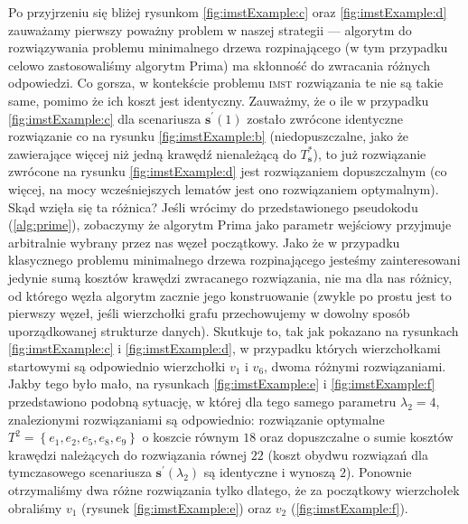 Po przyjrzeniu się bliżej rysunkom \ref{fig:imstExample:c} oraz \ref{fig:imstExample:d} zauważamy pierwszy poważny problem w naszej strategii --- algorytm do rozwiązywania problemu minimalnego drzewa rozpinającego (w tym przypadku celowo zastosowaliśmy algorytm Prima) ma skłonność do zwracania różnych odpowiedzi. Co gorsza, w kontekście problemu \textsc{imst} rozwiązania te nie są takie same, pomimo że ich koszt jest identyczny. Zauważmy, że o ile w przypadku \ref{fig:imstExample:c} dla scenariusza $\textbf{s}^{\prime} \left( 1 \right)$ zostało zwrócone identyczne rozwiązanie co na rysunku \ref{fig:imstExample:b} (niedopuszczalne, jako że zawierające więcej niż jedną krawędź nienależącą do $T^{\ast}_{\textbf{s}}$), to już rozwiązanie zwrócone na rysunku \ref{fig:imstExample:d} jest rozwiązaniem dopuszczalnym (co więcej, na mocy wcześniejszych lematów jest ono rozwiązaniem optymalnym). Skąd wzięła się ta różnica? Jeśli wrócimy do przedstawionego pseudokodu (\ref{alg:prime}), zobaczymy że algorytm Prima jako parametr wejściowy przyjmuje arbitralnie wybrany przez nas węzeł początkowy. Jako że w przypadku klasycznego problemu minimalnego drzewa rozpinającego jesteśmy zainteresowani jedynie sumą kosztów krawędzi zwracanego rozwiązania, nie ma dla nas różnicy, od którego węzła algorytm zacznie jego konstruowanie (zwykle po prostu jest to pierwszy węzeł, jeśli wierzchołki grafu przechowujemy w dowolny sposób uporządkowanej strukturze danych). Skutkuje to, tak jak pokazano na rysunkach \ref{fig:imstExample:c} i \ref{fig:imstExample:d}, w przypadku których wierzchołkami startowymi są odpowiednio wierzchołki $v_{1}$ i $v_{6}$, dwoma różnymi rozwiązaniami. Jakby tego było mało, na rysunkach \ref{fig:imstExample:e} i \ref{fig:imstExample:f} przedstawiono podobną sytuację, w której dla tego samego parametru $\lambda_{2} = 4$, znalezionymi rozwiązaniami są odpowiednio: rozwiązanie optymalne $T^{2} = \left\{ e_{1}, e_{2}, e_{5}, e_{8}, e_{9} \right\}$ o koszcie równym $18$ oraz dopuszczalne o sumie kosztów krawędzi należących do rozwiązania równej $22$ (koszt obydwu rozwiązań dla tymczasowego scenariusza $\textbf{s}^{\prime} \left( \lambda_{2} \right)$ są identyczne i wynoszą $2$). Ponownie otrzymaliśmy dwa różne rozwiązania tylko dlatego, że za początkowy wierzchołek obraliśmy $v_{1}$ (rysunek \ref{fig:imstExample:e}) oraz $v_{2}$ (\ref{fig:imstExample:f}).

